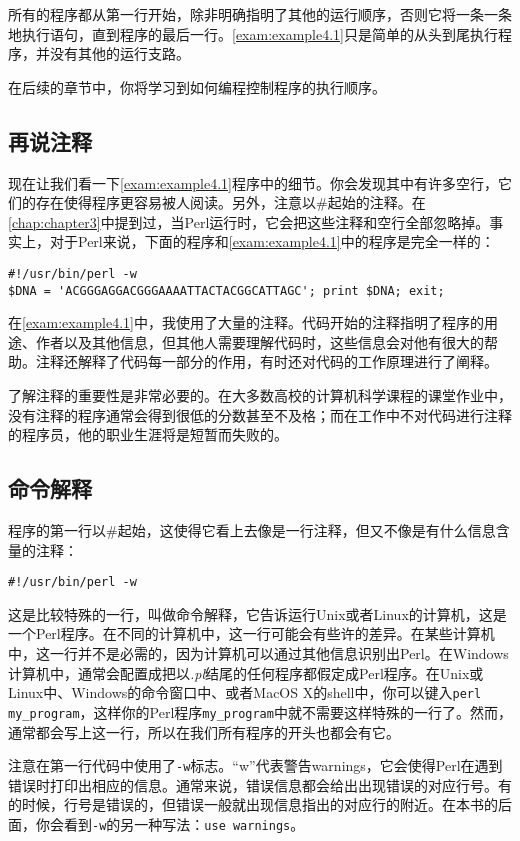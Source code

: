 所有的程序都从第一行开始，除非明确指明了其他的运行顺序，否则它将一条一条地执行语句，直到程序的最后一行。\autoref{exam:example4.1}只是简单的从头到尾执行程序，并没有其他的运行支路。

在后续的章节中，你将学习到如何编程控制程序的执行顺序。

\subsection{再说注释}
现在让我们看一下\autoref{exam:example4.1}程序中的细节。你会发现其中有许多空行，它们的存在使得程序更容易被人阅读。另外，注意以\#起始的注释。在\autoref{chap:chapter3}中提到过，当Perl运行时，它会把这些注释和空行全部忽略掉。事实上，对于Perl来说，下面的程序和\autoref{exam:example4.1}中的程序是完全一样的：

\begin{lstlisting}
#!/usr/bin/perl -w
$DNA = 'ACGGGAGGACGGGAAAATTACTACGGCATTAGC'; print $DNA; exit;
\end{lstlisting}

在\autoref{exam:example4.1}中，我使用了大量的注释。代码开始的注释指明了程序的用途、作者以及其他信息，但其他人需要理解代码时，这些信息会对他有很大的帮助。注释还解释了代码每一部分的作用，有时还对代码的工作原理进行了阐释。

了解注释的重要性是非常必要的。在大多数高校的计算机科学课程的课堂作业中，没有注释的程序通常会得到很低的分数甚至不及格；而在工作中不对代码进行注释的程序员，他的职业生涯将是短暂而失败的。

\subsection{命令解释}
程序的第一行以\#起始，这使得它看上去像是一行注释，但又不像是有什么信息含量的注释：

\begin{lstlisting}
#!/usr/bin/perl -w
\end{lstlisting}

这是比较特殊的一行，叫做命令解释，它告诉运行Unix或者Linux的计算机，这是一个Perl程序。在不同的计算机中，这一行可能会有些许的差异。在某些计算机中，这一行并不是必需的，因为计算机可以通过其他信息识别出Perl。在Windows计算机中，通常会配置成把以\textit{.pl}结尾的任何程序都假定成Perl程序。在Unix或Linux中、Windows的命令窗口中、或者MacOS X的shell中，你可以键入\verb|perl my_program|，这样你的Perl程序\verb|my_program|中就不需要这样特殊的一行了。然而，通常都会写上这一行，所以在我们所有程序的开头也都会有它。

注意在第一行代码中使用了\verb|-w|标志。“w”代表警告warnings，它会使得Perl在遇到错误时打印出相应的信息。通常来说，错误信息都会给出出现错误的对应行号。有的时候，行号是错误的，但错误一般就出现信息指出的对应行的附近。在本书的后面，你会看到\verb|-w|的另一种写法：\verb|use warnings|。


